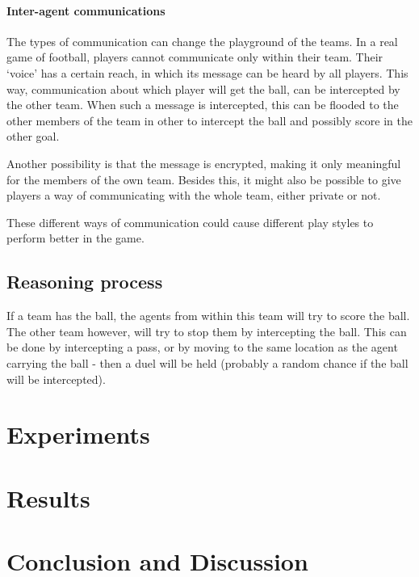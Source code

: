 \documentclass{article}
\begin{document}
\paragraph{Inter-agent communications}
The types of communication can change the playground of the teams.
In a real game of football, players cannot communicate only within their team.
Their `voice' has a certain reach, in which its message can be heard by all players.
This way, communication about which player will get the ball, can be intercepted by the other team.
When such a message is intercepted, this can be flooded to the other members of the team in other to intercept the ball and possibly score in the other goal.

Another possibility is that the message is encrypted, making it only meaningful for the members of the own team.
Besides this, it might also be possible to give players a way of communicating with the whole team, either private or not.

These different ways of communication could cause different play styles to perform better in the game.
\subsection{Reasoning process}
If a team has the ball, the agents from within this team will try to score the ball.
The other team however, will try to stop them by intercepting the ball.
This can be done by intercepting a pass, or by moving to the same location as the agent carrying the ball - then a duel will be held (probably a random chance if the ball will be intercepted).

\section{Experiments}

\section{Results}

\section{Conclusion and Discussion}
\end{document}
